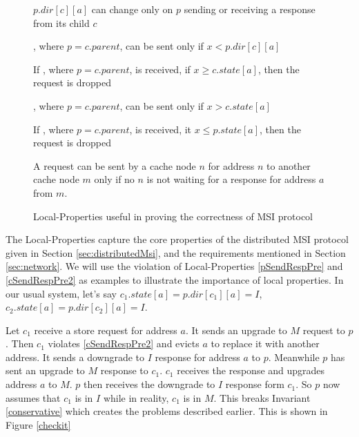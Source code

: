\begin{figure}
\begin{inv}
$p.dir[c][a]$ can change only on $p$ sending or receiving a response from
its child $c$\label{pState}
\end{inv}
%
\begin{inv}
, where $p = c.parent$, can be sent only if $x < p.dir[c][a]$\label{pSendReqPre}
\end{inv}
\begin{inv}
If , where $p = c.parent$, is received, if $x \ge c.state[a]$,
then the request is dropped\label{pSendReqPost}
\end{inv}
\begin{inv}
, where $p = c.parent$, can be sent only if $x > c.state[a]$\label{cSendReqPre}
\end{inv}
\begin{inv}
If , where $p = c.parent$, is received, it $x \le p.state[a]$,
then the request is dropped\label{cSendReqPost}
\end{inv}
\begin{inv}
A request can be sent by a cache node $n$ for address $n$ to another cache node $m$ only if
no $n$ is not waiting for a response for address $a$ from $m$.
\end{inv}
\caption{Local-Properties useful in proving the correctness of MSI protocol}
\label{sendReq}
\end{figure}

The Local-Properties capture the core properties of the distributed MSI
protocol given in Section \ref{sec:distributedMsi}, and the requirements
mentioned in Section \ref{sec:network}. We will use the violation of
Local-Properties \ref{pSendRespPre} and \ref{cSendRespPre2} as examples to
illustrate the importance of local properties.  In our usual system, let's say
$c_1.state[a] = p.dir[c_1][a] = I$, $c_2.state[a] = p.dir[c_2][a] = I$.

Let $c_1$ receive a store request for address $a$. It sends an upgrade to $M$
request to $p$. Then $c_1$ violates \ref{cSendRespPre2} and evicts $a$ to
replace it with another address. It sends a downgrade to $I$ response for
address $a$ to $p$.  Meanwhile $p$ has sent an upgrade to $M$ response to
$c_1$. $c_1$ receives the response and upgrades address $a$ to $M$. $p$ then
receives the downgrade to $I$ response form $c_1$. So $p$ now assumes that
$c_1$ is in $I$ while in reality, $c_1$ is in $M$. This breaks Invariant
\ref{conservative} which creates the problems described earlier. This is shown
in Figure \ref{checkit}

